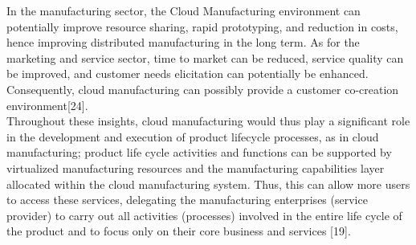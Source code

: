 In the manufacturing sector, the Cloud Manufacturing environment can potentially improve resource sharing, rapid prototyping, and reduction in costs, hence improving distributed manufacturing in the long term. As for the marketing and service sector, time to market can be reduced, service quality can be improved, and customer needs elicitation can potentially be enhanced. Consequently, cloud manufacturing can possibly provide a customer co-creation environment[24].\\
Throughout these insights, cloud manufacturing would thus play a significant role in the development and execution of product lifecycle processes, as in cloud manufacturing; product life cycle activities and functions can be supported by virtualized manufacturing resources and the manufacturing capabilities layer allocated within the cloud manufacturing system. Thus, this can allow more users to access these services, delegating the manufacturing enterprises (service provider) to carry out all activities (processes) involved in the entire life cycle of the product and to focus only on their core business and services [19].

